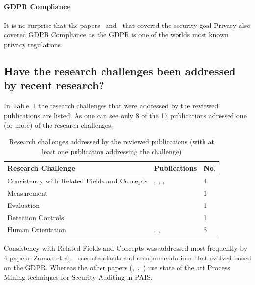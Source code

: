 \documentclass[runningheads]{llncs}
\begin{document}
\paragraph{GDPR Compliance} It is no surprise that the papers~\cite{Zaman20192982} and~\cite{MozafariMehr202182} that covered the security goal Privacy also covered GDPR Compliance as the GDPR is one of the worlds most known privacy regulations.
\subsection{Have the research challenges been addressed by recent research?}\label{Q2}
In Table~\ref{challenges_table} the research challenges that were addressed by the reviewed publications are listed. As one can see only 8 of the 17 publications adressed one (or more) of the research challenges.\\
\begin{table}
    \centering
    \caption{Research challenges addressed by the reviewed publications (with at least one publication addressing the challenge)}
    \label{challenges_table}
    \begin{tabular}{ | l | l | l | }
        \hline
        \textbf{Research Challenge}                  & \textbf{Publications}                                                                         & \textbf{No. } \\
        \hline
        \hline
        Consistency with Related Fields and Concepts & \cite{Zaman20192982}, \cite{Accorsi20131462}, \cite{Zahoransky2014360}, \cite{Dedousis202235} & 4             \\
        \hline
        Measurement                                  & \cite{Dedousis202235}                                                                         & 1             \\
        \hline
        Evaluation                                   & \cite{Zahoransky2014360}                                                                      & 1             \\

        \hline
        Detection Controls                           & \cite{Mishra2018613}                                                                          & 1             \\
        \hline
        Human Orientation                            & \cite{Mardani2013}, \cite{Zhu201783}, \cite{MacAk2020}                                        & 3             \\
        \hline
    \end{tabular}
\end{table}
Consistency with Related Fields and Concepts was addressed most frequently by 4 papers. Zaman et al.~\cite{Zaman20192982} uses standards and recoommendations that evolved based on the GDPR. Whereas the other papers (\cite{Accorsi20131462},~\cite{Zahoransky2014360},~\cite{Dedousis202235})
use state of the art Process Mining techniques for Security Auditing in PAIS.\\
\end{document}
